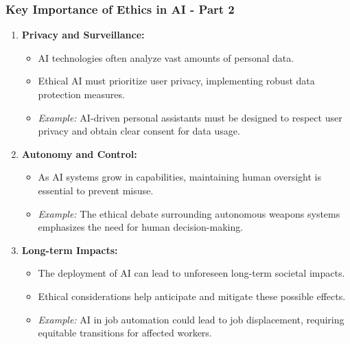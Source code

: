 \documentclass{beamer}
\begin{document}
\begin{frame}[fragile]
    \frametitle{Key Importance of Ethics in AI - Part 2}
    
    \begin{enumerate}[start=3]
        \item \textbf{Privacy and Surveillance:}
            \begin{itemize}
                \item AI technologies often analyze vast amounts of personal data.
                \item Ethical AI must prioritize user privacy, implementing robust data protection measures.
                \item \textit{Example:} AI-driven personal assistants must be designed to respect user privacy and obtain clear consent for data usage.
            \end{itemize}
        
        \item \textbf{Autonomy and Control:}
            \begin{itemize}
                \item As AI systems grow in capabilities, maintaining human oversight is essential to prevent misuse.
                \item \textit{Example:} The ethical debate surrounding autonomous weapons systems emphasizes the need for human decision-making.
            \end{itemize}

        \item \textbf{Long-term Impacts:}
            \begin{itemize}
                \item The deployment of AI can lead to unforeseen long-term societal impacts.
                \item Ethical considerations help anticipate and mitigate these possible effects.
                \item \textit{Example:} AI in job automation could lead to job displacement, requiring equitable transitions for affected workers.
            \end{itemize}
    \end{enumerate}
\end{frame}
\end{document}
